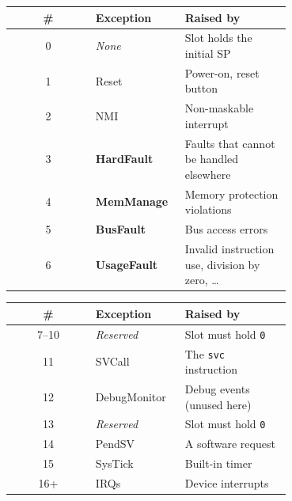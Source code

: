 \documentclass[a4paper,11pt]{article}
\begin{document}
\begin{table}[H]
	\centering
	\begin{minipage}[t]{0.48\textwidth}
		\vspace{0pt}
		\centering
		\begin{tabular}{c p{0.32\linewidth} p{0.38\linewidth}}
			\hline
			\# & Exception           & Raised by                                         \\
			\hline
			0  & \textit{None}       & Slot holds the initial SP                         \\
			1  & Reset               & Power-on, reset button                            \\
			2  & NMI                 & Non-maskable interrupt                            \\
			3  & \textbf{HardFault}  & Faults that cannot be handled elsewhere           \\
			4  & \textbf{MemManage}  & Memory protection violations                      \\
			5  & \textbf{BusFault}   & Bus access errors                                 \\
			6  & \textbf{UsageFault} & Invalid instruction use, division by zero, \ldots \\
			\hline
		\end{tabular}
	\end{minipage}
	\hfill
	\begin{minipage}[t]{0.48\textwidth}
		\vspace{0pt}
		\centering
		\begin{tabular}{c p{0.32\linewidth} p{0.38\linewidth}}
			\hline
			\#    & Exception         & Raised by                    \\
			\hline
			7--10 & \textit{Reserved} & Slot must hold \texttt{0}    \\
			11    & SVCall            & The \texttt{svc} instruction \\
			12    & DebugMonitor      & Debug events (unused here)   \\
			13    & \textit{Reserved} & Slot must hold \texttt{0}    \\
			14    & PendSV            & A software request           \\
			15    & SysTick           & Built-in timer               \\
			16+   & IRQs              & Device interrupts            \\
			\hline
		\end{tabular}
	\end{minipage}
\end{table}
\end{document}
